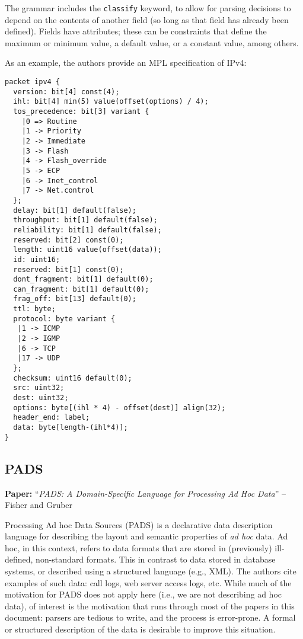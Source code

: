 \documentclass[10pt]{article}
\newcommand{\paper}[3]{\vspace{4mm}\noindent\textbf{Paper:} ``\textit{#1}'' -- #2 \cite{#3}\vspace{3mm}}
\begin{document}
The grammar includes the \texttt{classify} keyword, to allow for parsing decisions to
depend on the contents of another field (so long as that field has already been defined).
Fields have attributes; these can be constraints that define the maximum or minimum value,
a default value, or a constant value, among others. 

As an example, the authors provide an MPL specification of IPv4:

\begin{verbatim}
packet ipv4 {
  version: bit[4] const(4);
  ihl: bit[4] min(5) value(offset(options) / 4);
  tos_precedence: bit[3] variant {
    |0 => Routine
    |1 -> Priority
    |2 -> Immediate
    |3 -> Flash
    |4 -> Flash_override
    |5 -> ECP
    |6 -> Inet_control
    |7 -> Net.control
  };
  delay: bit[1] default(false);
  throughput: bit[1] default(false);
  reliability: bit[1] default(false);
  reserved: bit[2] const(0);
  length: uint16 value(offset(data));
  id: uint16;
  reserved: bit[1] const(0);
  dont_fragment: bit[1] default(0);
  can_fragment: bit[1] default(0);
  frag_off: bit[13] default(0);
  ttl: byte;
  protocol: byte variant {
   |1 -> ICMP
   |2 -> IGMP
   |6 -> TCP
   |17 -> UDP
  };
  checksum: uint16 default(0);
  src: uint32;
  dest: uint32;
  options: byte[(ihl * 4) - offset(dest)] align(32);
  header_end: label;
  data: byte[length-(ihl*4)];
}
\end{verbatim}

\subsection{PADS}
\paper{PADS: A Domain-Specific Language for Processing Ad Hoc Data}{Fisher and Gruber}{fisher2005pads}

Processing Ad hoc Data Sources (PADS) is a declarative data description language for
describing the layout and semantic properties of \emph{ad hoc} data. Ad hoc, in this
context, refers to data formats that are stored in (previously) ill-defined, non-standard
formats. This in contrast to data stored in database systems, or described using a
structured language (e.g., XML). The authors cite examples of such data: call logs, web
server access logs, etc. While much of the motivation for PADS does not apply here (i.e.,
we are not describing ad hoc data), of interest is the motivation that runs through most
of the papers in this document: parsers are tedious to write, and the process is
error-prone. A formal or structured description of the data is desirable to improve this
situation.
\end{document}
